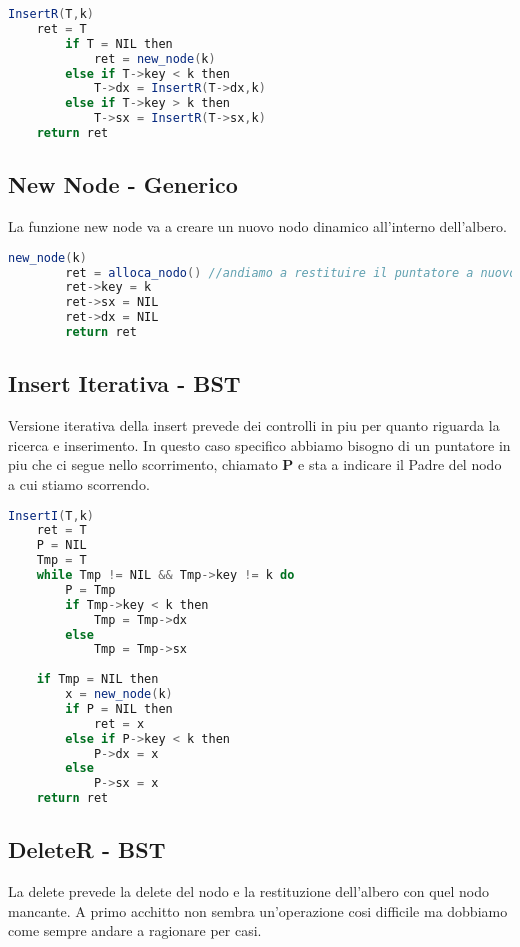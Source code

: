 \begin{lstlisting}[language=Java]
	InsertR(T,k)
	ret = T
		if T = NIL then
			ret = new_node(k)
		else if T->key < k then
			T->dx = InsertR(T->dx,k)
		else if T->key > k then
			T->sx = InsertR(T->sx,k)
	return ret
\end{lstlisting}

\subsection{New Node - Generico}
La funzione new node va a creare un nuovo nodo dinamico all'interno dell'albero.

\begin{lstlisting}[language=Java]
	new_node(k)
		ret = alloca_nodo() //andiamo a restituire il puntatore a nuovo nodo allocato in memoria a ret
		ret->key = k
		ret->sx = NIL
		ret->dx = NIL
		return ret
\end{lstlisting}

\subsection{Insert Iterativa - BST}
Versione iterativa della insert prevede dei controlli in piu per quanto riguarda la ricerca e inserimento. In questo caso specifico abbiamo bisogno di un puntatore in piu che ci segue nello scorrimento, chiamato \textbf{P} e sta a indicare il Padre del nodo a cui stiamo scorrendo.

\begin{lstlisting}[language=Java]
	InsertI(T,k)
	ret = T
	P = NIL
	Tmp = T
	while Tmp != NIL && Tmp->key != k do
		P = Tmp
		if Tmp->key < k then
			Tmp = Tmp->dx
		else
			Tmp = Tmp->sx
	
	if Tmp = NIL then
		x = new_node(k)
		if P = NIL then
			ret = x
		else if P->key < k then
			P->dx = x
		else
			P->sx = x
	return ret
\end{lstlisting}

\subsection{DeleteR - BST}
La delete prevede la delete del nodo e la restituzione dell'albero con quel nodo mancante. A primo acchitto non sembra un'operazione cosi difficile ma dobbiamo come sempre andare a ragionare per casi.

